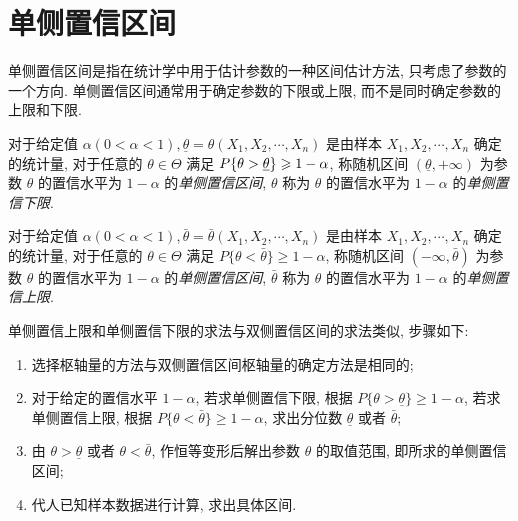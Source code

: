 \section{单侧置信区间}

单侧置信区间是指在统计学中用于估计参数的一种区间估计方法, 只考虑了参数的一个方向. 单侧置信区间通常用于确定参数的下限或上限, 而不是同时确定参数的上限和下限. 

\begin{definition}[单侧置信下限]
    对于给定值 $ \alpha(0<\alpha<1), \underline{\theta}=\theta\left(X_{1}, X_{2}, \cdots, X_{n}\right) $ 是由样本 $ X_{1}, X_{2}, \cdots, X_{n}$ 确定的统计量, 对于任意的 $ \theta \in \Theta $ 满足 $ P\qty{\theta>\underline{\theta}} \geqslant 1-\alpha$, 称随机区间 $ (\underline{\theta},+\infty) $ 为参数 $ \theta $ 的置信水平为 $ 1-\alpha $ 的\textit{单侧置信区间}, $ \theta $ 称为 $ \theta $ 的置信水平为 $ 1-\alpha $ 的\textit{单侧置信下限}.
\end{definition}

\begin{definition}[单侧置信上限]
    对于给定值 $ \alpha(0<\alpha<1), \bar{\theta}=\bar{\theta}\left(X_{1}, X_{2}, \cdots, X_{n}\right) $ 是由样本 $ X_{1}, X_{2}, \cdots, X_{n} $ 确定的统计量, 对于任意的 $ \theta \in \Theta $ 满足 $ P\{\theta<\bar{\theta}\} \geqslant 1-\alpha$, 称随机区间 $ (-\infty, \bar{\theta}) $ 为参数 $ \theta $ 的置信水平为 $ 1-\alpha $ 的\textit{单侧置信区间}, $ \bar{\theta} $ 称为 $ \theta $ 的置信水平为 $ 1-\alpha $ 的\textit{单侧置信上限}.
\end{definition}

单侧置信上限和单侧置信下限的求法与双侧置信区间的求法类似, 步骤如下:
\begin{enumerate}[label=(\arabic{*})]
    \item 选择枢轴量的方法与双侧置信区间枢轴量的确定方法是相同的;
    \item 对于给定的置信水平 $ 1-\alpha $, 若求单侧置信下限, 根据 $ P\{\theta>\underline{\theta}\} \geqslant 1-\alpha $, 若求单侧置信上限, 根据 $ P\{\theta<\bar{\theta}\} \geqslant 1-\alpha$, 求出分位数 $ \underline{\theta} $ 或者 $ \bar{\theta} $;
    \item 由 $ \theta>\underline{\theta} $ 或者 $ \theta<\bar{\theta} $, 作恒等变形后解出参数 $ \theta $ 的取值范围, 即所求的单侧置信区间;
    \item 代人已知样本数据进行计算, 求出具体区间.
\end{enumerate}

